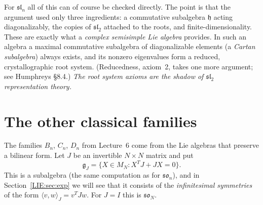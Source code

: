 \documentclass[11pt,openany]{book}
\theoremstyle{plain}
\theoremstyle{definition}
\theoremstyle{remark}
\newcommand{\ip}[2]{\langle #1, #2\rangle}
\begin{document}
For $\mathfrak{sl}_n$ all of this can of course be checked directly. The point is that the argument used
only three ingredients: a commutative subalgebra $\mathfrak h$ acting diagonalizably, the copies of
$\mathfrak{sl}_2$ attached to the roots, and finite-dimensionality. These are exactly what a
\emph{complex semisimple Lie algebra} provides. In such an algebra a maximal commutative subalgebra of
diagonalizable elements (a \emph{Cartan subalgebra}) always exists, and its nonzero eigenvalues form a
reduced, crystallographic root system. (Reducedness, axiom~2, takes one more argument; see Humphreys
\S8.4.) \emph{The root system axioms are the shadow of $\mathfrak{sl}_2$ representation theory.}

\section{The other classical families}
\label{LIE:sec:classical}

The families $B_n$, $C_n$, $D_n$ from Lecture~6 come from the Lie algebras that preserve a bilinear
form. Let $J$ be an invertible $N\times N$ matrix and put
\[
  \mathfrak g_J=\{X\in M_N: X^TJ+JX=0\}.
\]
This is a subalgebra (the same computation as for $\mathfrak{so}_n$), and in Section~\ref{LIE:sec:exp}
we will see that it consists of the \emph{infinitesimal symmetries} of the form $\ip{v}{w}_J=v^TJw$.
For $J=I$ this is $\mathfrak{so}_N$.
\end{document}
